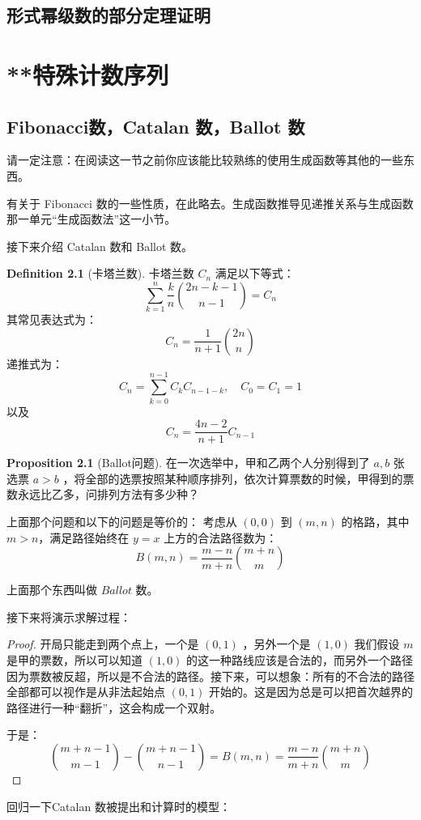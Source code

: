 \documentclass[oneside]{book}
\theoremstyle{definition}
\newtheorem{proposition}{Proposition}[section]
\newtheorem{definition}{Definition}[section]
\begin{document}
  
  
  
  
  
  
  
  
  
  
  
  
  
  
\section{形式幂级数的部分定理证明}
\chapter{**特殊计数序列}
\section{Fibonacci数，Catalan 数，Ballot 数}
请一定注意：在阅读这一节之前你应该能比较熟练的使用生成函数等其他的一些东西。

有关于 Fibonacci 数的一些性质，在此略去。生成函数推导见递推关系与生成函数那一单元“生成函数法”这一小节。

接下来介绍 Catalan 数和 Ballot 数。
\begin{definition}[卡塔兰数]
	卡塔兰数 \( C_n \) 满足以下等式：
	\[
	\sum_{k=1}^n \frac{k}{n} \binom{2n - k - 1}{n - 1} = C_n
	\]
	其常见表达式为：
	\[
	C_n = \frac{1}{n+1} \binom{2n}{n}
	\]
	递推式为：
	\[
	C_n = \sum_{k=0}^{n-1} C_k C_{n-1-k}, \quad C_0 = C_1 = 1
	\]
	以及
	\[
	C_n = \frac{4n-2}{n+1} C_{n-1}
	\]
\end{definition}
\begin{proposition}[Ballot问题]
	在一次选举中，甲和乙两个人分别得到了 \(a,b\) 张选票 \(a>b\) ，将全部的选票按照某种顺序排列，依次计算票数的时候，甲得到的票数永远比乙多，问排列方法有多少种？
\end{proposition}
上面那个问题和以下的问题是等价的：
考虑从 \((0,0)\) 到 \((m,n)\) 的格路，其中 \(m > n\)，满足路径始终在 \(y = x\) 上方的合法路径数为：
\[
B(m,n) = \frac{m - n}{m + n} \binom{m + n}{m}
\]

上面那个东西叫做 \(Ballot\) 数。

接下来将演示求解过程：
\begin{proof}
	开局只能走到两个点上，一个是 \((0,1)\) ，另外一个是 \((1,0)\) 我们假设 \( m\) 是甲的票数，所以可以知道 \((1,0)\) 的这一种路线应该是合法的，而另外一个路径因为票数被反超，所以是不合法的路径。接下来，可以想象：所有的不合法的路径全部都可以视作是从非法起始点 \((0,1)\) 开始的。这是因为总是可以把首次越界的路径进行一种“翻折”，这会构成一个双射。
	
	于是：
	\[\binom{m+n-1}{m-1}-\binom{m+n-1}{n-1}=B(m,n) = \frac{m - n}{m + n} \binom{m + n}{m}\]
\end{proof}
回归一下Catalan 数被提出和计算时的模型：
\end{document}
